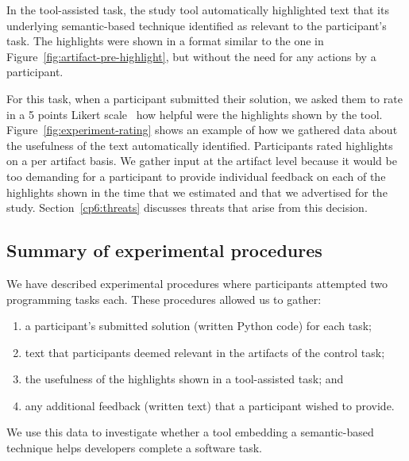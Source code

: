 In the tool-assisted task, the study tool automatically highlighted text that 
its underlying semantic-based technique identified as relevant to the participant's task.
The highlights were shown in a format similar to the one in Figure~\ref{fig:artifact-pre-highlight}, but without the need for any actions by a participant.




For this task, when a participant submitted their solution, we asked them to 
rate in a 5 points Likert scale~\cite{likert1932technique} how helpful were the highlights shown by the tool.
Figure~\ref{fig:experiment-rating} shows an example of how we gathered data about the usefulness of the text automatically identified.
Participants rated highlights on a per artifact basis.
We gather input at the artifact level because it would be too demanding for a participant 
to provide individual feedback on each of the highlights shown
in the time that we estimated and that we advertised for the study.
Section~\ref{cp6:threats} discusses  threats that arise from this decision.







\subsection{Summary of experimental procedures}


We have described experimental procedures 
where participants attempted two programming tasks each.
These procedures allowed us to gather:


\begin{enumerate}
\item a participant's submitted solution (written Python code) for each task;
\item text that participants deemed relevant in the artifacts of the control task;
\item the usefulness of the highlights shown in a tool-assisted task; and
\item any additional feedback (written text) that a participant wished to provide.
\end{enumerate}


We use this data to investigate whether 
a tool embedding a semantic-based technique helps developers complete a software task. 


\clearpage


